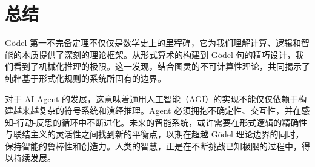 \documentclass[a4paper,12pt]{ctexart}
\begin{document}
\section{总结}
Gödel 第一不完备定理不仅仅是数学史上的里程碑，它为我们理解计算、逻辑和智能的本质提供了深刻的理论框架。从形式算术的构建到 Gödel 句的精巧设计，我们看到了机械化推理的极限。这一发现，结合图灵的不可计算性理论，共同揭示了纯粹基于形式化规则的系统所固有的边界。

对于 AI Agent 的发展，这意味着通用人工智能（AGI）的实现不能仅仅依赖于构建越来越复杂的符号系统和演绎推理。Agent 必须拥抱不确定性、交互性，并在感知-行动-反思的循环中不断进化。未来的智能系统，或许需要在形式逻辑的精确性与联结主义的灵活性之间找到新的平衡点，以期在超越 Gödel 理论边界的同时，保持智能的鲁棒性和创造力。人类的智慧，正是在不断挑战已知极限的过程中，得以持续发展。
\end{document}
